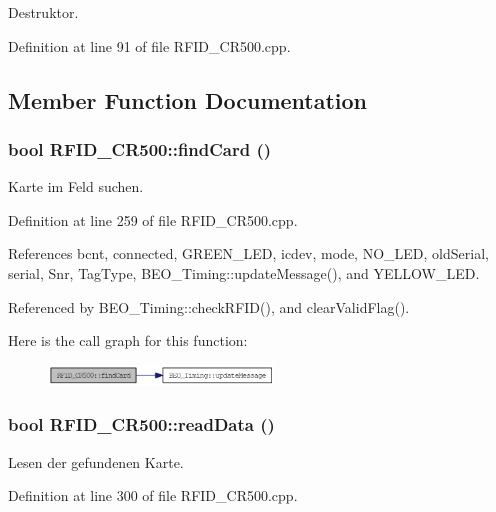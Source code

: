 Destruktor. 



Definition at line 91 of file RFID\_\-CR500.cpp.

\subsection{Member Function Documentation}
\hypertarget{class_r_f_i_d___c_r500_7d3f44b888f7da7cea83111f41bb6d95}{
\subsubsection[findCard]{\setlength{\rightskip}{0pt plus 5cm}bool RFID\_\-CR500::findCard ()}}
\label{class_r_f_i_d___c_r500_7d3f44b888f7da7cea83111f41bb6d95}


Karte im Feld suchen. 



Definition at line 259 of file RFID\_\-CR500.cpp.

References bcnt, connected, GREEN\_\-LED, icdev, mode, NO\_\-LED, oldSerial, serial, Snr, TagType, BEO\_\-Timing::updateMessage(), and YELLOW\_\-LED.

Referenced by BEO\_\-Timing::checkRFID(), and clearValidFlag().

Here is the call graph for this function:\nopagebreak
\begin{figure}[H]
\begin{center}
\leavevmode
\includegraphics[width=170pt]{class_r_f_i_d___c_r500_7d3f44b888f7da7cea83111f41bb6d95_cgraph}
\end{center}
\end{figure}
\hypertarget{class_r_f_i_d___c_r500_0ff3f9ea5a0d59d36532bcdd21854755}{
\subsubsection[readData]{\setlength{\rightskip}{0pt plus 5cm}bool RFID\_\-CR500::readData ()}}
\label{class_r_f_i_d___c_r500_0ff3f9ea5a0d59d36532bcdd21854755}


Lesen der gefundenen Karte. 



Definition at line 300 of file RFID\_\-CR500.cpp.

